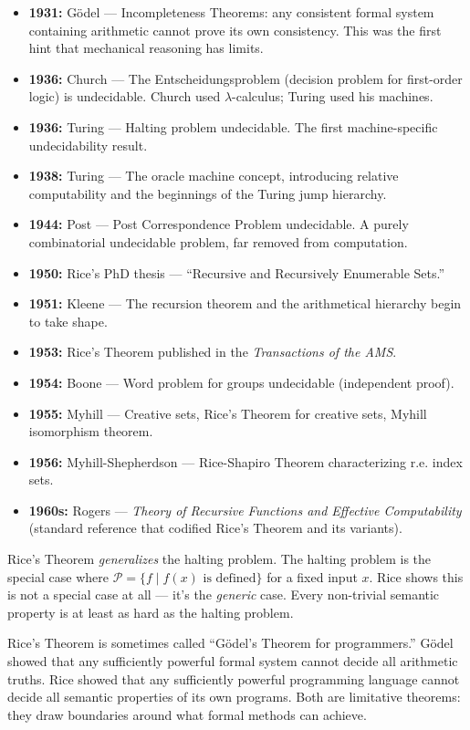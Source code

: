 \begin{itemize}
\item \textbf{1931:} G\"odel --- Incompleteness Theorems: any consistent formal system containing arithmetic cannot prove its own consistency. This was the first hint that mechanical reasoning has limits.
\item \textbf{1936:} Church --- The Entscheidungsproblem (decision problem for first-order logic) is undecidable. Church used $\lambda$-calculus; Turing used his machines.
\item \textbf{1936:} Turing --- Halting problem undecidable. The first machine-specific undecidability result.
\item \textbf{1938:} Turing --- The oracle machine concept, introducing relative computability and the beginnings of the Turing jump hierarchy.
\item \textbf{1944:} Post --- Post Correspondence Problem undecidable. A purely combinatorial undecidable problem, far removed from computation.
\item \textbf{1950:} Rice's PhD thesis --- ``Recursive and Recursively Enumerable Sets.''
\item \textbf{1951:} Kleene --- The recursion theorem and the arithmetical hierarchy begin to take shape.
\item \textbf{1953:} Rice's Theorem published in the \emph{Transactions of the AMS}.
\item \textbf{1954:} Boone --- Word problem for groups undecidable (independent proof).
\item \textbf{1955:} Myhill --- Creative sets, Rice's Theorem for creative sets, Myhill isomorphism theorem.
\item \textbf{1956:} Myhill-Shepherdson --- Rice-Shapiro Theorem characterizing r.e. index sets.
\item \textbf{1960s:} Rogers --- \emph{Theory of Recursive Functions and Effective Computability} (standard reference that codified Rice's Theorem and its variants).
\end{itemize}

Rice's Theorem \emph{generalizes} the halting problem. The halting problem is the special case where $\mathcal{P} = \{ f \mid f(x) \text{ is defined} \}$ for a fixed input $x$. Rice shows this is not a special case at all --- it's the \emph{generic} case. Every non-trivial semantic property is at least as hard as the halting problem.

Rice's Theorem is sometimes called ``G\"odel's Theorem for programmers.'' G\"odel showed that any sufficiently powerful formal system cannot decide all arithmetic truths. Rice showed that any sufficiently powerful programming language cannot decide all semantic properties of its own programs. Both are limitative theorems: they draw boundaries around what formal methods can achieve.

